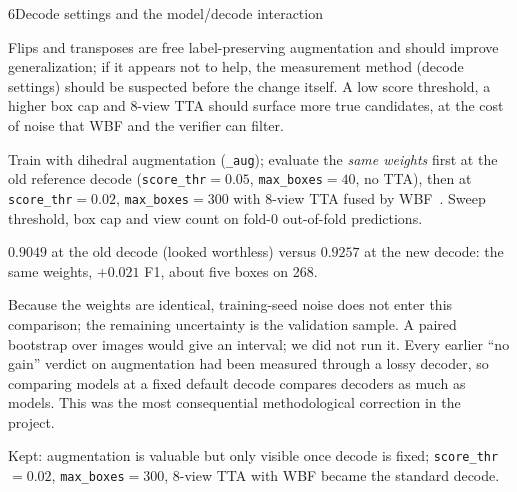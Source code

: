\begin{explog}{6}{Decode settings and the model/decode interaction}
\item[Hypothesis] Flips and transposes are free label-preserving augmentation and should improve generalization; if it appears not to help, the measurement method (decode settings) should be suspected before the change itself. A low score threshold, a higher box cap and 8-view TTA should surface more true candidates, at the cost of noise that WBF and the verifier can filter.
\item[Method] Train with dihedral augmentation (\texttt{\_aug}); evaluate the \emph{same weights} first at the old reference decode (\texttt{score\_thr}$=0.05$, \texttt{max\_boxes}$=40$, no TTA), then at \texttt{score\_thr}$=0.02$, \texttt{max\_boxes}$=300$ with 8-view TTA fused by WBF~\cite{solovyev2021wbf}. Sweep threshold, box cap and view count on fold-0 out-of-fold predictions.
\item[Result] $0.9049$ at the old decode (looked worthless) versus $0.9257$ at the new decode: the same weights, $+0.021$ F1, about five boxes on 268.
\item[Inference] Because the weights are identical, training-seed noise does not enter this comparison; the remaining uncertainty is the validation sample. A paired bootstrap over images would give an interval; we did not run it. Every earlier ``no gain'' verdict on augmentation had been measured through a lossy decoder, so comparing models at a fixed default decode compares decoders as much as models. This was the most consequential methodological correction in the project.
\item[Verdict] Kept: augmentation is valuable but only visible once decode is fixed; \texttt{score\_thr}$=0.02$, \texttt{max\_boxes}$=300$, 8-view TTA with WBF became the standard decode.
\end{explog}

